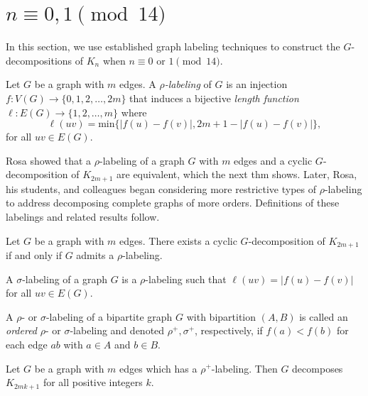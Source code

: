 \chapter{$n\equiv 0,1\pmod{14}$}
\label{intro_chapter}

In this section, we use established graph labeling techniques to construct the $G$-decompositions of $K_n$ when $n \equiv 0 \textrm{ or } 1 \pmod{14}$. 



\begin{definition} \label{def:rho} 
 Let $G$ be a graph with $m$ edges.  A \textit{$\rho$-labeling} of $G$ is an injection $f: V(G) \rightarrow \{0,1,2, \dots, 2m\}$ that induces a bijective \textit{length function $\ell: E(G) \rightarrow \{1,2, \dots, m\}$} where 
    $$
    \ell(uv) = \text{min}\{|f(u)-f(v)|,2m+1-|f(u)-f(v)|\},
    $$
for all  $uv \in E(G)$.
\end{definition}

Rosa showed that a $\rho$-labeling of a graph $G$ with $m$ edges and a cyclic $G$-decomposition of $K_{2m+1}$ are equivalent, which the next thm shows. Later, Rosa, his students, and colleagues began considering more restrictive types of $\rho$-labeling to address decomposing complete graphs of more orders. Definitions of these labelings and related results follow.

\begin{thm}\label{thm:Rhosa}  
Let $G$ be a graph with $m$ edges.  There exists a cyclic $G$-decomposition of $K_{2m+1}$ if and only if $G$ admits a $\rho$-labeling.
\end{thm}

\begin{definition} \label{def:sigma} 
A $\sigma$-labeling of a graph $G$ is a $\rho$-labeling such that $\ell(uv) = |f(u) - f(v)|$ for all $uv \in E(G).$
\end{definition}

\begin{definition} \label{def:rho and sigma ordered def} 
A $\rho$- or $\sigma$-labeling of a bipartite graph $G$ with bipartition $(A,B)$ is called an \emph{ordered} $\rho$- or $\sigma$-labeling and denoted $\rho^+,\sigma^+$, respectively, if $f(a) < f(b)$ for each edge $ab$ with $a \in A$ and $b \in B$.
\end{definition}

\begin{thm} \label{thm:rho plus}
Let $G$ be a graph with $m$ edges which has a $\rho^+$-labeling.  Then $G$ decomposes $K_{2mk+1}$ for all positive integers $k$.
\end{thm}

